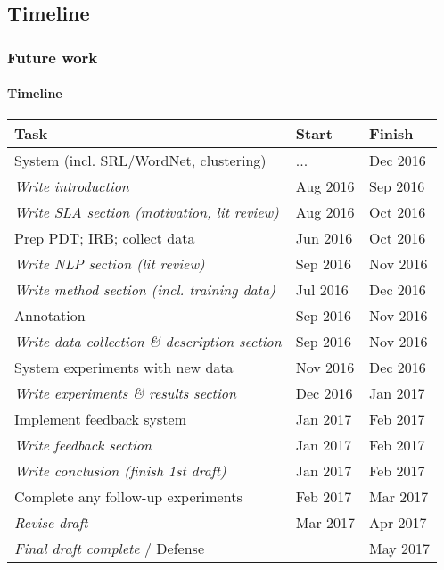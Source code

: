 \documentclass{beamer}
\begin{document}
\subsection{Timeline}
\begin{frame}
\frametitle{Future work}
\framesubtitle{Timeline}
\begin{center}
\footnotesize
\begin{tabular}{|l|l|l|}
  \hline
  \textbf{Task} & \textbf{Start} & \textbf{Finish} \\
  \hline
  \hline
  System (incl. SRL/WordNet, clustering) & ... & Dec 2016 \\
  \hline
  \textit{Write introduction} & Aug 2016 & Sep 2016 \\
  \hline
  \textit{Write SLA section (motivation, lit review)} & Aug 2016 & Oct 2016 \\
  \hline
  Prep PDT; IRB; collect data & Jun 2016 & Oct 2016 \\
  \hline
  \textit{Write NLP section (lit review)} & Sep 2016 & Nov 2016 \\
  \hline
  \textit{Write method section (incl. training data)} & Jul 2016 & Dec 2016 \\
  \hline
  Annotation & Sep 2016 & Nov 2016 \\
  \hline
  \textit{Write data collection \& description section} & Sep 2016 & Nov 2016 \\
  \hline
  System experiments with new data & Nov 2016 & Dec 2016 \\
  \hline
  \textit{Write experiments \& results section} & Dec 2016 & Jan 2017 \\
  \hline
  Implement feedback system & Jan 2017 & Feb 2017 \\
  \hline
  \textit{Write feedback section} & Jan 2017 & Feb 2017 \\
  \hline
  \textit{Write conclusion (finish 1st draft)} & Jan 2017 & Feb 2017 \\
  \hline
  Complete any follow-up experiments & Feb 2017 & Mar 2017 \\
  \hline
  \textit{Revise draft} & Mar 2017 & Apr 2017 \\
  \hline
  \textit{Final draft complete} / Defense & & May 2017 \\
  \hline
\end{tabular}
\end{center}
\end{frame}
\end{document}
